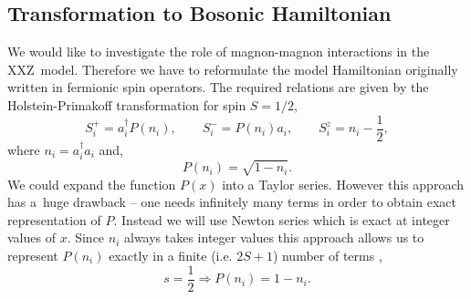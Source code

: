 \documentclass[12pt, a4paper]{article}
\begin{document}
\subsection{Transformation to Bosonic Hamiltonian}
We would like to investigate the role of magnon-magnon interactions in the XXZ~model. Therefore we have to reformulate the model Hamiltonian originally written in fermionic spin operators. The required relations are given by the Holstein-Primakoff transformation for spin $S = 1/2$,
\begin{equation}
	S_i^+ = a_i^\dagger P(n_i), \quad\quad
	S_i^- = P(n_i) a_i, \quad\quad
	S_i^z = n_i - \frac{1}{2},
\end{equation}
where $n_i = a_i^\dagger a_i$ and,
\begin{equation}
	P(n_i) = \sqrt{1 - n_i}.	
\end{equation}
We could expand the function $P(x)$ into a Taylor series. However this approach has a~huge drawback -- one needs infinitely many terms in order to obtain exact representation of $P$. Instead we will use Newton series which is exact at integer values of $x$. Since $n_i$ always takes integer values this approach allows us to represent $P(n_i)$ exactly in a finite (i.e. $2S+1$) number of terms \cite{knig2020newton}, 
\begin{equation}
	s = \frac{1}{2} \Rightarrow P(n_i) = 1 - n_i.
\end{equation}
\end{document}
